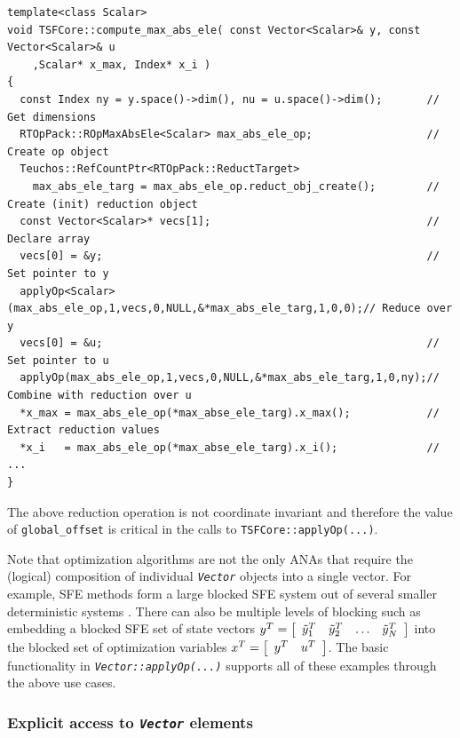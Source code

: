 {\scriptsize\begin{verbatim}
template<class Scalar>
void TSFCore::compute_max_abs_ele( const Vector<Scalar>& y, const Vector<Scalar>& u
    ,Scalar* x_max, Index* x_i )
{
  const Index ny = y.space()->dim(), nu = u.space()->dim();       // Get dimensions
  RTOpPack::ROpMaxAbsEle<Scalar> max_abs_ele_op;                  // Create op object
  Teuchos::RefCountPtr<RTOpPack::ReductTarget>
    max_abs_ele_targ = max_abs_ele_op.reduct_obj_create();        // Create (init) reduction object
  const Vector<Scalar>* vecs[1];                                  // Declare array
  vecs[0] = &y;                                                   // Set pointer to y
  applyOp<Scalar>(max_abs_ele_op,1,vecs,0,NULL,&*max_abs_ele_targ,1,0,0);// Reduce over y
  vecs[0] = &u;                                                   // Set pointer to u
  applyOp(max_abs_ele_op,1,vecs,0,NULL,&*max_abs_ele_targ,1,0,ny);// Combine with reduction over u
  *x_max = max_abs_ele_op(*max_abse_ele_targ).x_max();            // Extract reduction values
  *x_i   = max_abs_ele_op(*max_abse_ele_targ).x_i();              // ...
}
\end{verbatim}}

{}\noindent{}The above reduction operation is not coordinate invariant and
therefore the value of \texttt{global\_offset} is critical in the
calls to \texttt{TSFCore\-::applyOp(\-...)}.

Note that optimization algorithms are not the only ANAs that require
the (logical) composition of individual \texttt{\textit{Vector}}
objects into a single vector.  For example, SFE methods form a large
blocked SFE system out of several smaller deterministic systems
\cite{ref:sfe}.  There can also be multiple levels of blocking such as
embedding a blocked SFE set of state vectors $y^T = \bmat{cccc}
\tilde{y}_1^T & \tilde{y}_2^T & \ldots & \tilde{y}_N^T \emat$ into the blocked set of
optimization variables $x^T = \bmat{cc} y^T & u^T \emat$.  The basic
functionality in \texttt{\textit{Vector\-::applyOp(\-...)}} supports
all of these examples through the above use cases.

%
\subsubsection{Explicit access to \texttt{\textit{Vector}} elements}
\label{tsfcore:sec:explicit_vec_access}
%

